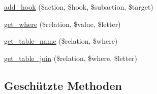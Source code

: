 \begin{DoxyCompactItemize}
\item 
\hyperlink{classSunhill_1_1Properties_1_1oo__property_a95b8b57fb873f0a0a1a9ab76d1764265}{add\+\_\+hook} (\$action, \$hook, \$subaction, \$target)
\item 
\hyperlink{classSunhill_1_1Properties_1_1oo__property_ad4f9b4068e9ee45b7c809b9a125f0ee7}{get\+\_\+where} (\$relation, \$value, \$letter)
\item 
\hyperlink{classSunhill_1_1Properties_1_1oo__property_aef588a0f7083f8c0456d5d23ba79cefe}{get\+\_\+table\+\_\+name} (\$relation, \$where)
\item 
\hyperlink{classSunhill_1_1Properties_1_1oo__property_a2582d0218d0b3b7755f1fc6ca0fb0617}{get\+\_\+table\+\_\+join} (\$relation, \$where, \$letter)
\end{DoxyCompactItemize}
\subsection*{Geschützte Methoden}
